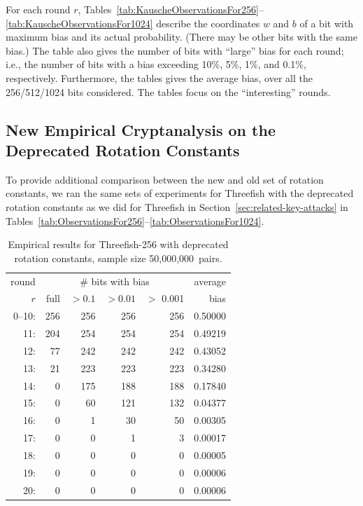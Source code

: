 \documentclass[11pt,twoside]{article}
\begin{document}
For each round $r$, Tables~\ref{tab:KauscheObservationsFor256}--\ref{tab:KauscheObservationsFor1024} describe the coordinates $w$ and $b$ of a bit with maximum bias and its actual probability. (There may be other bits with the same bias.) The table also gives the number of bits with ``large'' bias for each round; i.e., the number of bits with a bias exceeding 10\%, 5\%, 1\%, and 0.1\%, respectively. Furthermore, the tables gives the average bias, over all the 256/512/1024 bits considered.  The tables focus on the ``interesting'' rounds. 

\subsection{New Empirical Cryptanalysis on the Deprecated Rotation Constants}

To provide additional comparison between the new and old set of rotation constants, we ran the same sets of experiments for Threefish with the deprecated rotation constants as we did for Threefish in Section~\ref{sec:related-key-attacks} in Tables~\ref{tab:ObservationsFor256}--\ref{tab:ObservationsFor1024}.

\begin{table}[tbh]
  \centering
\begin{tabular}{|r|rrrr|r|}
\hline
round & \multicolumn{ 4}{c|}{\# bits with bias} & average\\
$r$ & \quad full & $>0.1$ & $>0.01$ & $>$ 0.001 & bias \\  \hline
0--10: &  256 &  256 &  256 &  256 & 0.50000  \\
 11: &  204 &  254 &  254 &  254 & 0.49219  \\
 12: &  77 &  242 &  242 &  242 & 0.43052  \\
 13: &  21 &  223 &  223 &  223 & 0.34280  \\
 14: &  0 &  175 &  188 &  188 & 0.17840  \\
 15: &  0 &  60 &  121 &  132 & 0.04377  \\
 16: &  0 &  1 &  30 &  50 & 0.00305  \\
 17: &  0 &  0 &  1 &  3 & 0.00017  \\
 18: &  0 &  0 &  0 &  0 & 0.00005  \\
 19: &  0 &  0 &  0 &  0 & 0.00006  \\
 20: &  0 &  0 &  0 &  0 & 0.00006  \\
\hline
\end{tabular}
\caption{Empirical results for Threefish-256 with deprecated rotation constants, sample size 50,000,000~pairs.}
\label{tab:Observations-256-Old}
\end{table}
\end{document}
